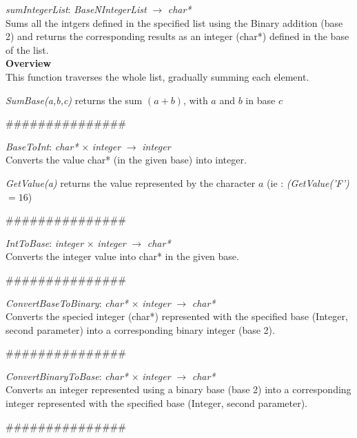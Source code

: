 \documentclass[book, backcover, english, nodocumentinfo]{upmethodology-document}
\newcommand{\nxtalgo}{\centerline{$$$$\#\#\#\#\#\#\#\#\#\#\#\#\#\#\#$$$$}}
\newcommand{\ov}{\textbf{Overview}}
\begin{document}
		\begin{minipage}{\linewidth}
			\textit{sumIntegerList}: \textit{BaseNIntegerList} $\rightarrow$ \textit{char*}\\
			Sums all the intgers defined in the specified list using the Binary addition (base 2) and returns the corresponding results as an integer (char*) defined in the base of the list.\\
			\ov\\
			This function traverses the whole list, gradually summing each element.
			\label{algo:BNIL-SumIntegerList}
			
			\textit{SumBase(a,b,c)} returns the sum $(a+b)$, with $a$ and $b$ in base $c$
		\end{minipage}
		\nxtalgo{}

		\begin{minipage}{\linewidth}
			\textit{BaseToInt}: \textit{char*} $\times$ \textit{integer} $\rightarrow$ \textit{integer}\\
			Converts the value char* (in the given base) into integer.
			\label{algo:BNIL-BaseToInt}
			
			\textit{GetValue(a)} returns the value represented by the character $a$
			(ie : \textit{(GetValue('F')} $= 16$)
		\end{minipage}
		\nxtalgo{}

		\begin{minipage}{\linewidth}
			\textit{IntToBase}: \textit{integer} $\times$ \textit{integer} $\rightarrow$ \textit{char*}\\
			Converts the integer value into char* in the given base.
			\label{algo:BNIL-IntToBase}
			
		\end{minipage}
		\nxtalgo{}

		\begin{minipage}{\linewidth}
			\textit{ConvertBaseToBinary}: \textit{char*} $\times$ \textit{integer} $\rightarrow$ \textit{char*}\\
			Converts the specied integer (char*) represented with the specified base (Integer, second parameter) into a corresponding binary integer (base 2).
			\label{algo:BNIL-ConvertBaseToBinary}
			
		\end{minipage}
		\nxtalgo{}

		\begin{minipage}{\linewidth}
			\textit{ConvertBinaryToBase}: \textit{char*} $\times$ \textit{integer} $\rightarrow$ \textit{char*}\\
			Converts an integer represented using a binary base (base 2) into a corresponding integer represented with the specified base (Integer, second parameter).
			\label{algo:BNIL-ConvertBinaryToBase}
			
		\end{minipage}
		\nxtalgo{}
\end{document}
